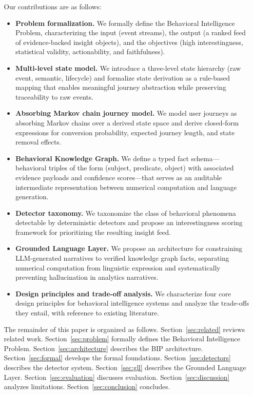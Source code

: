 \documentclass[12pt, a4paper]{article}
\begin{document}
Our contributions are as follows:

\begin{itemize}[leftmargin=1.5em]
  \item \textbf{Problem formalization.} We formally define the Behavioral Intelligence Problem, characterizing the input (event streams), the output (a ranked feed of evidence-backed insight objects), and the objectives (high interestingness, statistical validity, actionability, and faithfulness).

  \item \textbf{Multi-level state model.} We introduce a three-level state hierarchy (raw event, semantic, lifecycle) and formalize state derivation as a rule-based mapping that enables meaningful journey abstraction while preserving traceability to raw events.

  \item \textbf{Absorbing Markov chain journey model.} We model user journeys as absorbing Markov chains over a derived state space and derive closed-form expressions for conversion probability, expected journey length, and state removal effects.

  \item \textbf{Behavioral Knowledge Graph.} We define a typed fact schema---behavioral triples of the form (subject, predicate, object) with associated evidence payloads and confidence scores---that serves as an auditable intermediate representation between numerical computation and language generation.

  \item \textbf{Detector taxonomy.} We taxonomize the class of behavioral phenomena detectable by deterministic detectors and propose an interestingness scoring framework for prioritizing the resulting insight feed.

  \item \textbf{Grounded Language Layer.} We propose an architecture for constraining LLM-generated narratives to verified knowledge graph facts, separating numerical computation from linguistic expression and systematically preventing hallucination in analytics narratives.

  \item \textbf{Design principles and trade-off analysis.} We characterize four core design principles for behavioral intelligence systems and analyze the trade-offs they entail, with reference to existing literature.
\end{itemize}

The remainder of this paper is organized as follows. Section~\ref{sec:related} reviews related work. Section~\ref{sec:problem} formally defines the Behavioral Intelligence Problem. Section~\ref{sec:architecture} describes the BIP architecture. Section~\ref{sec:formal} develops the formal foundations. Section~\ref{sec:detectors} describes the detector system. Section~\ref{sec:gll} describes the Grounded Language Layer. Section~\ref{sec:evaluation} discusses evaluation. Section~\ref{sec:discussion} analyzes limitations. Section~\ref{sec:conclusion} concludes.
\end{document}
